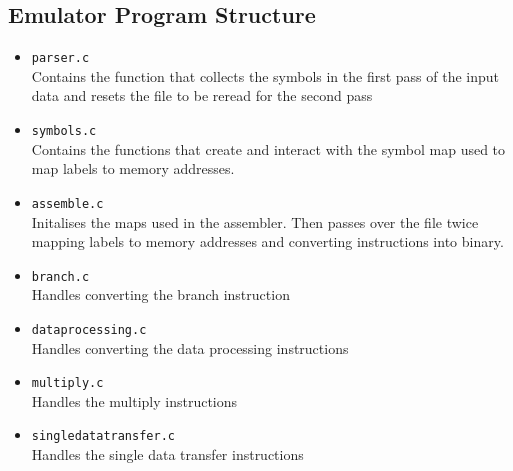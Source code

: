 \documentclass[8pt]{article}
\begin{document}
\begin{minipage}{0.45\textwidth}
\subsection{Emulator Program Structure}

\begin{itemize}
    \item \texttt{parser.c} \\Contains the function that collects the symbols in the first pass of the
    input data and resets the file to be reread for the second pass
    \item \texttt{symbols.c} \\Contains the functions that create and interact with the
    symbol map used to map labels to memory addresses.
    \item \texttt{assemble.c} \\Initalises the maps used in the assembler. Then 
    passes over the file twice mapping labels to memory addresses and converting
    instructions into binary.
    \item \texttt{branch.c} \\Handles converting the branch instruction
    \item \texttt{dataprocessing.c} \\Handles converting the data processing
    instructions
    \item \texttt{multiply.c} \\Handles the multiply instructions
    \item \texttt{singledatatransfer.c} \\Handles the single data transfer instructions
\end{itemize}
\end{minipage}%
\hfill
\end{document}
